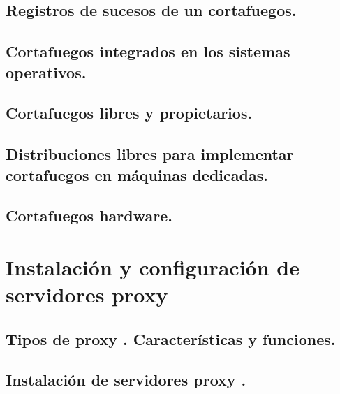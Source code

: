 \documentclass[letterpaper,10pt,spanish]{sphinxmanual}
\begin{document}
\section{Registros de sucesos de un cortafuegos.}
\label{\detokenize{tema_cortafuegos/tema_cortafuegos:registros-de-sucesos-de-un-cortafuegos}}

\section{Cortafuegos integrados en los sistemas operativos.}
\label{\detokenize{tema_cortafuegos/tema_cortafuegos:cortafuegos-integrados-en-los-sistemas-operativos}}

\section{Cortafuegos libres y propietarios.}
\label{\detokenize{tema_cortafuegos/tema_cortafuegos:cortafuegos-libres-y-propietarios}}

\section{Distribuciones libres para implementar cortafuegos en máquinas dedicadas.}
\label{\detokenize{tema_cortafuegos/tema_cortafuegos:distribuciones-libres-para-implementar-cortafuegos-en-maquinas-dedicadas}}

\section{Cortafuegos hardware.}
\label{\detokenize{tema_cortafuegos/tema_cortafuegos:cortafuegos-hardware}}

\chapter{Instalación y configuración de servidores  proxy}
\label{\detokenize{tema_proxys/tema_proxys:instalacion-y-configuracion-de-servidores-proxy}}\label{\detokenize{tema_proxys/tema_proxys::doc}}

\section{Tipos de  proxy . Características y funciones.}
\label{\detokenize{tema_proxys/tema_proxys:tipos-de-proxy-caracteristicas-y-funciones}}

\section{Instalación de servidores  proxy .}
\label{\detokenize{tema_proxys/tema_proxys:instalacion-de-servidores-proxy}}
\end{document}
